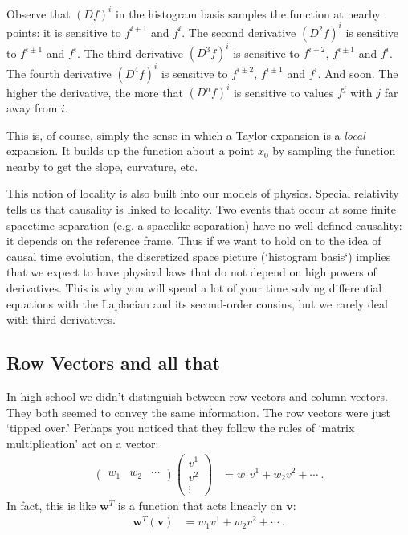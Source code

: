 \documentclass[12pt]{article}
\numberwithin{equation}{section}    %
\renewcommand{\vec}[1]{\mathbf{#1}} %
\begin{document}
Observe that $(Df)^i$ in the histogram basis samples the function at nearby points: it is sensitive to $f^{i+1}$ and $f^i$. 
%
The second derivative $(D^2f)^i$ is sensitive to $f^{i\pm 1}$ and $f^{i}$. 
%
The third derivative $(D^3f)^i$ is sensitive to $f^{i + 2}$, $f^{i\pm 1}$ and $f^{i}$. The fourth derivative $(D^4f)^i$ is sensitive to $f^{i\pm 2}$, $f^{i\pm 1}$ and $f^{i}$. And soon. The higher the derivative, the more that $(D^nf)^i$ is sensitive to values $f^j$ with $j$ far away from $i$. 

This is, of course, simply the sense in which a Taylor expansion is a \emph{local} expansion. It builds up the function about a point $x_0$ by sampling the function nearby to get the slope, curvature, etc. 

This notion of locality is also built into our models of physics. Special relativity tells us that causality is linked to locality. Two events that occur at some finite spacetime separation (e.g. a spacelike separation) have no well defined causality: it depends on the reference frame. Thus if we want to hold on to the idea of causal time evolution, the discretized space picture (`histogram basis‘) implies that we expect to have physical laws that do not depend on high powers of derivatives. This is why you will spend a lot of your time solving differential equations with the Laplacian and its second-order cousins, but we rarely deal with third-derivatives. 


\subsection{Row Vectors and all that}

In high school we didn’t distinguish between row vectors and column vectors. They both seemed to convey the same information. The row vectors were just `tipped over.’ Perhaps you noticed that they follow the rules of `matrix multiplication’ act on a vector:
\begin{align}
  \begin{pmatrix}
    w_1 & w_2 & \cdots
  \end{pmatrix}
  \begin{pmatrix}
    v^1 \\
    v^2 \\
    \vdots
  \end{pmatrix}
  &= 
  w_1 v^1 + w_2 v^2 + \cdots \ .
\end{align}
In fact, this is like $\vec{w}^T$ is a function that acts linearly on $\vec{v}$: 
\begin{align}
  \vec{w}^T(\vec v) &= w_1 v^1 + w_2 v^2 + \cdots \ .
\end{align}
\end{document}

